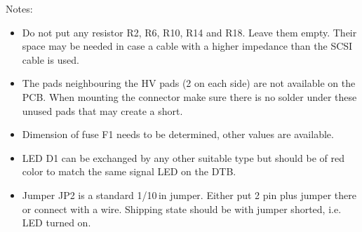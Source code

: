 \bigskip

Notes:
\begin{itemize}
    \item Do not put any resistor R2, R6, R10, R14 and R18. Leave them empty. Their space may be needed in case a cable with a higher impedance than the SCSI cable is used.
    \item The pads neighbouring the HV pads (2 on each side) are not available on the PCB. When mounting the connector make sure there is no solder under these unused pads that may create a short.
    \item Dimension of fuse F1 needs to be determined, other values are available.
    \item LED D1 can be exchanged by any other suitable type but should be of red color to match the same signal LED on the DTB.
    \item Jumper JP2 is a standard 1/10\,in jumper. Either put 2 pin plus jumper there or connect with a wire. Shipping state should be with jumper shorted, i.e. LED turned on.
\end{itemize}


